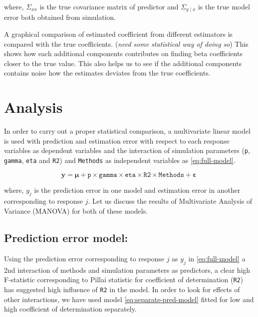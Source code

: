 \documentclass[12pt,3p,authoryear]{elsarticle}
\providecommand{\tightlist}{%
  \setlength{\itemsep}{0pt}\setlength{\parskip}{0pt}}
\begin{document}
where, \(\Sigma_{xx}\) is the true covariance matrix of predictor and
\(\Sigma_{y\mid x}\) is the true model error both obtained from
simulation.

\begin{description}
\tightlist
\item[Comparison of estimated coefficients with true coefficients]
A graphical comparison of estimated coefficient from different
estimators is compared with the true coefficients. (\emph{need some
statistical way of doing so}) This shows how each additional components
contributes on finding beta coefficients closer to the true value. This
also helps us to see if the additional components contains noise how the
estimates deviates from the true coefficients.
\end{description}

\hypertarget{analysis}{\section{Analysis}\label{analysis}}

In order to carry out a proper statistical comparison, a multivariate
linear model is used with prediction and estimation error with respect
to each response variables as dependent variables and the interaction of
simulation parameters (\texttt{p}, \texttt{gamma}, \texttt{eta} and
\texttt{R2}) and \texttt{Methods} as independent variables as
\eqref{eq:full-model}.

\begin{equation}
\mathbf{y} = \boldsymbol{\mu} + \texttt{p} \times \texttt{gamma} \times \texttt{eta} \times \texttt{R2} \times \texttt{Methods} + \boldsymbol{\varepsilon}
\label{eq:full-model}
\end{equation}

where, \(y_j\) is the prediction error in one model and estimation error
in another corresponding to response \(j\). Let us discuss the results
of Multivariate Analysis of Variance (MANOVA) for both of these models.

\subsection{Prediction error model:}\label{prediction-error-model}

Using the prediction error corresponding to response \(j\) as \(y_j\) in
\eqref{eq:full-model} a 2nd interaction of methods and simulation
parameters as predictors, a clear high F-statistic corresponding to
Pillai statistic for coefficient of determination (\texttt{R2}) has
suggested high influence of \texttt{R2} in the model. In order to look
for effects of other interactions, we have used model
\eqref{eq:separate-pred-model} fitted for low and high coefficient of
determination separately.
\end{document}
